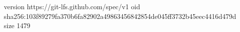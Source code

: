 version https://git-lfs.github.com/spec/v1
oid sha256:103f89279fa370b6fa82902a49863456842854de045ff3732b45eec4416d479d
size 1479
